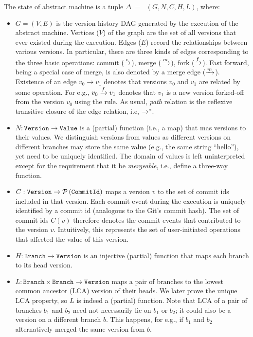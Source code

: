 The state of \quark abstract machine is a tuple $\Delta \;=\; $ 
$(G,N,C,H,L)$, where:
\begin{itemize}
  \item $G = (V,E)$ is the version history DAG generated by the
    execution of the abstract machine. Vertices ($V$) of the graph are
    the set of all versions that ever existed during the execution.
    Edges ($E$) record the relationships between various versions. In
    particular, there are three kinds of edges corresponding to the
    three basic operations: commit ($\xrightarrow{c}$), merge ($\xrightarrow{m}$), fork
    ($\xrightarrow{f}$). Fast forward, being a special case of merge, is also
    denoted by a merge edge ($\xrightarrow{m}$). Existence of an edge $v_0
    \rightarrow  v_1$ denotes that versions $v_0$ and $v_1$ are related by
    some operation. For e.g., $v_0 \xrightarrow{f} v_1$ denotes that $v_1$ is a
    new version forked-off from the version $v_0$ using the
     rule. As usual, \emph{path} relation is the
    reflexive transitive closure of the edge relation, i.e,
    $\rightarrow^{*}$.

  \item $N : \texttt{Version} \rightarrow \texttt{Value}$ is a
    (partial) function (i.e., a map) that mas versions to their
    values.  We distinguish versions from values as different versions
    on different branches may store the same value (e.g., the same
    string ``hello''), yet need to be uniquely identified. The domain
    of values is left uninterpreted except for the requirement that
    it be \emph{mergeable}, i.e., define a three-way 
    function.

  \item $C : \texttt{Version} \rightarrow \mathcal{P}\left(\texttt{CommitId}\right)$
    maps a version $v$ to the set of commit ids included in that
    version. Each commit event during the execution is uniquely
    identified by a commit id (analogous to the Git's commit hash).
    The set of commit ids $C(v)$ therefore denotes the commit events
    that contributed to the version $v$. Intuitively, this represents
    the set of user-initiated operations that affected the value of
    this version.

  \item $H : \texttt{Branch} \rightarrow \texttt{Version}$ is an
    injective (partial) function that maps each branch to its head
    version. 

  \item $L: \texttt{Branch}\times\texttt{Branch} \rightarrow
    \texttt{Version}$ maps a pair of branches to the lowest common
    ancestor (LCA) version of their heads. We later prove the unique
    LCA property, so $L$ is indeed a (partial) function. Note that LCA
    of a pair of branches $b_1$ and $b_2$ need not necessarily lie on
    $b_1$ or $b_2$; it could also be a version on a different branch
    $b$. This happens, for e.g., if $b_1$ and $b_2$ alternatively
    merged the same version from $b$.
\end{itemize}

